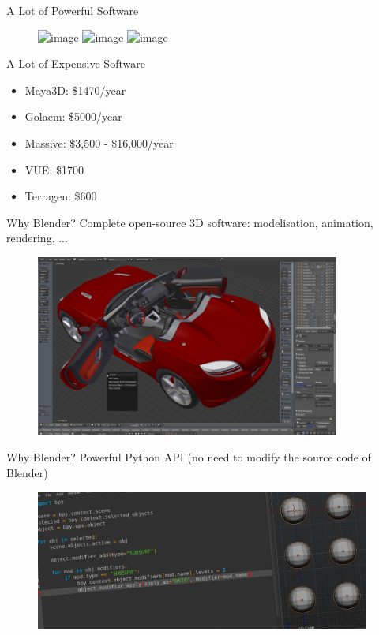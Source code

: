 \documentclass{beamer}
\begin{document}
\begin{frame}{A Lot of Powerful Software}


\begin{figure}
  \includegraphics<1>[width=.95\textwidth]{golaem.jpg}
  \includegraphics<2>[width=.95\textwidth]{massive.jpg}
  \includegraphics<3>[width=.95\textwidth]{VUE.png}\\
\end{figure}

\end{frame}

\begin{frame}{A Lot of Expensive Software}
  \begin{itemize}
    \item Maya3D: \$1470/year
    \item Golaem: \$5000/year
    \item Massive: \$3,500 - \$16,000/year
    \item VUE: \$1700
    \item Terragen: \$600
  \end{itemize}
\end{frame}

\begin{frame}{Why Blender?}
  Complete open-source 3D software: modelisation, animation, rendering, ...
    \begin{figure}
        \includegraphics[width=10cm]{blender_mod}
    \end{figure}
\end{frame}

\begin{frame}{Why Blender?}
  Powerful Python API (no need to modify the source code of Blender)
  \begin{figure}
        \includegraphics[width=11cm]{blender_script}
    \end{figure}
\end{frame}
\end{document}
